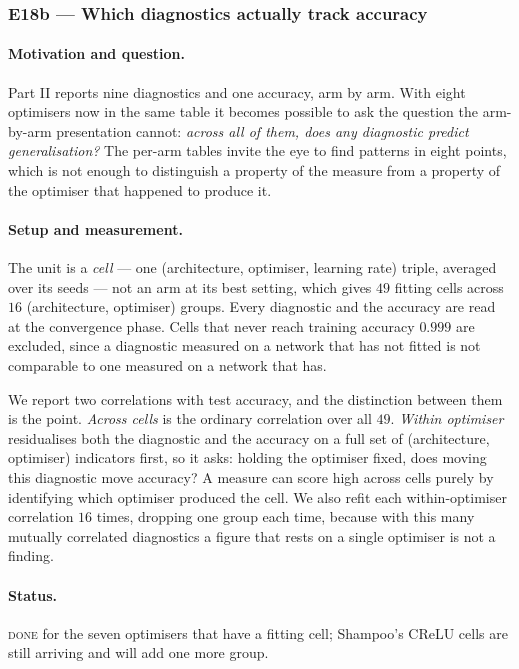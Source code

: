 \documentclass{article} %
\theoremstyle{plain}
\theoremstyle{definition}
\theoremstyle{remark}
\begin{document}
\subsubsection{E18b --- Which diagnostics actually track accuracy}
\label{sec:e18b}

\paragraph{Motivation and question.}
Part II reports nine diagnostics and one accuracy, arm by arm. With eight optimisers now in the
same table it becomes possible to ask the question the arm-by-arm presentation cannot:
\emph{across all of them, does any diagnostic predict generalisation?} The per-arm tables invite
the eye to find patterns in eight points, which is not enough to distinguish a property of the
measure from a property of the optimiser that happened to produce it.

\paragraph{Setup and measurement.}
The unit is a \emph{cell} --- one (architecture, optimiser, learning rate) triple, averaged over
its seeds --- not an arm at its best setting, which gives $49$ fitting cells across $16$
(architecture, optimiser) groups. Every diagnostic and the accuracy are read at the convergence
phase. Cells that never reach training accuracy $0.999$ are excluded, since a diagnostic measured
on a network that has not fitted is not comparable to one measured on a network that has.

We report two correlations with test accuracy, and the distinction between them is the point.
\emph{Across cells} is the ordinary correlation over all $49$. \emph{Within optimiser}
residualises both the diagnostic and the accuracy on a full set of (architecture, optimiser)
indicators first, so it asks: holding the optimiser fixed, does moving this diagnostic move
accuracy? A measure can score high across cells purely by identifying which optimiser produced the
cell. We also refit each within-optimiser correlation $16$ times, dropping one group each time,
because with this many mutually correlated diagnostics a figure that rests on a single optimiser
is not a finding.

\paragraph{Status.} \textsc{done} for the seven optimisers that have a fitting cell; Shampoo's
CReLU cells are still arriving and will add one more group.
\end{document}
